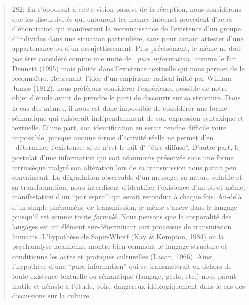 \begin{quote}
282: En s{\textquoteright}opposant \`a cette vision passive de la r\'eception, nous consid\'erons que les discursivit\'es qui entourent les m\`emes Internet proc\`edent d{\textquoteright}actes d{\textquoteright}\'enonciation qui manifestent la reconnaissance de l{\textquoteright}existence d{\textquoteright}un groupe d{\textquoteright}individus dans une situation particuli\`ere, sans pour autant attester d{\textquoteright}une appartenance ou d{\textquoteright}un assujettissement. Plus pr\'ecis\'ement, le m\`eme ne doit pas \^etre consid\'er\'e comme une unit\'e de {\guillemotleft}~\textit{pure information~{\guillemotright}} comme le fait Dennett (1995) mais plut\^ot dans l{\textquoteright}existence textuelle qui nous permet de le reconna\^itre. Reprenant l{\textquoteright}id\'ee d{\textquoteright}un empirisme radical initi\'e par William James (1912), nous pr\'ef\'erons consid\'erer l'exp\'erience possible de notre objet d{\textquoteright}\'etude avant de prendre le parti de discourir sur sa structure. Dans la cas des m\`emes, il nous est donc impossible de consid\'erer une forme s\'emantique qui existerait ind\'ependamment de son expression syntaxique et textuelle. D{\textquoteright}une part, son identification en serait rendue difficile voire impossible, puisque aucune forme d{\textquoteright}activit\'e r\'eelle ne permet d{\textquoteright}en \ d\'eterminer l{\textquoteright}existence, si ce n{\textquoteright}est le fait d{\textquoteright} {\textquotedblright}\^etre diffus\'e{\textquotedblright}. D{\textquoteright}autre part, le postulat d{\textquoteright}une information qui soit n\'eanmoins pr\'eserv\'ee sous une forme intrins\`eque malgr\'e son alt\`eration lors de sa transmission nous parait peu convaincant. La d\'egradation observable d{\textquoteright}un message, sa nature volatile et sa transformation, nous interdisent d{\textquoteright}identifier l{\textquoteright}existence d{\textquoteright}un objet m\`eme, manifestation d{\textquoteright}un {\textquotedblleft}pur esprit{\textquotedblright} qui serait reconduit \`a chaque fois. Au-del\`a d{\textquoteright}un simple ph\'enom\`ene de transmission, le m\`eme s{\textquoteright}ancre dans le langage puisqu{\textquoteright}il est somme toute \textit{formul\'e}. Nous pensons que la corporalit\'e des langages est un \'el\'ement sur-d\'eterminant aux processus de transmission humains. L{\textquoteright}hypoth\`ese de Sapir-Whorf (Kay \& Kempton, 1984) ou la psychanalyse lacanienne montre bien comment le langage structure et conditionne les actes et pratiques culturelles (Lacan, 1966). Ainsi, l{\textquoteright}hypoth\`ese d{\textquoteright}une {\textquotedblleft}pure information{\textquotedblright} qui se transmettrait en dehors de toute existence textuelle ou s\'emantique (langage, geste, etc.) nous para\^it inutile et n\'efaste \`a l{\textquoteright}\'etude, voire dangereux id\'eologiquement dans le cas des discussions sur la culture.  

\end{quote}
